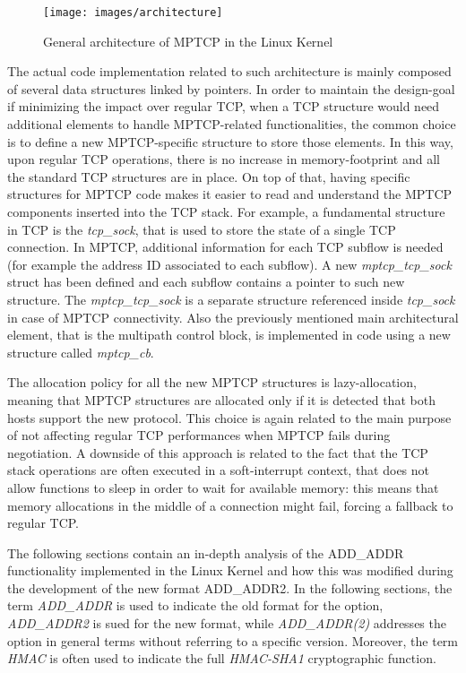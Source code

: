 \begin{figure}[!htb]
\centering
\texttt{[image: images/architecture]}
\caption{General architecture of MPTCP in the Linux Kernel}
\label{fig:architecture}
\end{figure}

The actual code implementation related to such architecture is mainly composed of several data structures linked by pointers. In order to maintain the design-goal if minimizing the impact over regular TCP, when a TCP structure would need additional elements to handle MPTCP-related functionalities, the common choice is to define a new MPTCP-specific structure to store those elements. In this way, upon regular TCP operations, there is no increase in memory-footprint and all the standard TCP structures are in place. On top of that, having specific structures for MPTCP code makes it easier to read and understand the MPTCP components inserted into the TCP stack. For example, a fundamental structure in TCP is the \textit{tcp\_sock}, that is used to store the state of a single TCP connection. In MPTCP, additional information for each TCP subflow is needed (for example the address ID associated to each subflow). A new \textit{mptcp\_tcp\_sock} struct has been defined and each subflow contains a pointer to such new structure. The \textit{mptcp\_tcp\_sock} is a separate structure referenced inside \textit{tcp\_sock} in case of MPTCP connectivity.
Also the previously mentioned main architectural element, that is the multipath control block, is implemented in code using a new structure called \textit{mptcp\_cb}.

The allocation policy for all the new MPTCP structures is lazy-allocation, meaning that MPTCP structures are allocated only if it is detected that both hosts support the new protocol. This choice is again related to the main purpose of not affecting regular TCP performances when MPTCP fails during negotiation. A downside of this approach is related to the fact that the TCP stack operations are often executed in a soft-interrupt context, that does not allow functions to sleep in order to wait for available memory: this means that memory allocations in the middle of a connection might fail, forcing a fallback to regular TCP.

The following sections contain an in-depth analysis of the ADD\_ADDR functionality implemented in the Linux Kernel and how this was modified during the development of the new format ADD\_ADDR2. In the following sections, the term \textit{ADD\_ADDR} is used to indicate the old format for the option, \textit{ADD\_ADDR2} is sued for the new format, while \textit{ADD\_ADDR(2)} addresses the option in general terms without referring to a specific version. Moreover, the term \textit{HMAC} is often used to indicate the full \textit{HMAC-SHA1} cryptographic function.

